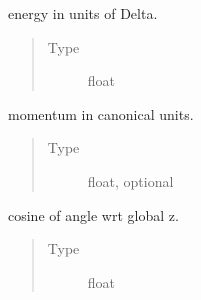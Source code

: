 \documentclass[letterpaper,10pt,english]{sphinxmanual}
\begin{document}
\begin{fulllineitems}
\begin{quote}
\begin{description}
\begin{itemize}
\end{itemize}

\end{description}\end{quote}

\begin{fulllineitems}
\label{\detokenize{code_structure:scdc.particle.Particle.energy}}
energy in units of Delta.
\begin{quote}\begin{description}
\item[{Type}] \leavevmode
float

\end{description}\end{quote}

\end{fulllineitems}


\begin{fulllineitems}
\label{\detokenize{code_structure:scdc.particle.Particle.momentum}}
momentum in canonical units.
\begin{quote}\begin{description}
\item[{Type}] \leavevmode
float, optional

\end{description}\end{quote}

\end{fulllineitems}


\begin{fulllineitems}
\label{\detokenize{code_structure:scdc.particle.Particle.cos_theta}}
cosine of angle wrt global z.
\begin{quote}\begin{description}
\item[{Type}] \leavevmode
float

\end{description}\end{quote}


\end{fulllineitems}
\end{fulllineitems}
\end{document}
